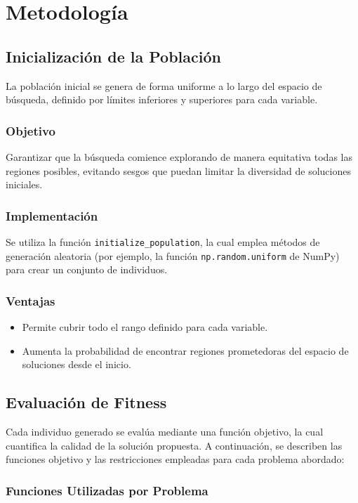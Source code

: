 \chapter{Metodolog\'ia}

\section{Inicializaci\'on de la Poblaci\'on}
La poblaci\'on inicial se genera de forma uniforme a lo largo del espacio de b\'usqueda, definido por l\'imites inferiores y superiores para cada variable.

\subsection*{Objetivo}
Garantizar que la b\'usqueda comience explorando de manera equitativa todas las regiones posibles, evitando sesgos que puedan limitar la diversidad de soluciones iniciales.

\subsection*{Implementaci\'on}
Se utiliza la funci\'on \texttt{initialize\_population}, la cual emplea m\'etodos de generaci\'on aleatoria (por ejemplo, la funci\'on \texttt{np.random.uniform} de NumPy) para crear un conjunto de individuos.

\subsection*{Ventajas}
\begin{itemize}
    \item Permite cubrir todo el rango definido para cada variable.
    \item Aumenta la probabilidad de encontrar regiones prometedoras del espacio de soluciones desde el inicio.
\end{itemize}

\section{Evaluación de Fitness}

Cada individuo generado se evalúa mediante una función objetivo, la cual cuantifica la calidad de la solución propuesta. A continuación, se describen las funciones objetivo y las restricciones empleadas para cada problema abordado:

\subsection*{Funciones Utilizadas por Problema}

